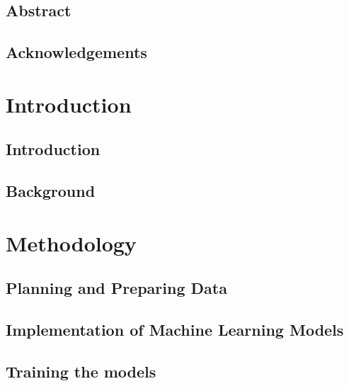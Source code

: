 \documentclass[UKenglish]{ifimaster}
\title{\problemStatement}
\subtitle{
}
\author{Joakim Ihle Frogner}
\begin{document}
\duoforside[dept={Department of Informatics},
program={Programming and Networks},
long]

\frontmatter{}
\chapter*{Abstract}


\chapter*{Acknowledgements}


\tableofcontents{} 
\listoffigures{}
\listoftables{}

\mainmatter{}
\part{Introduction}

\chapter{Introduction}
\label{chapter:introduction}


\chapter{Background}
\label{chapter:background}


\part{Methodology}
\chapter{Planning and Preparing Data}
\label{chapter:planning}


\chapter{Implementation of Machine Learning Models}
\label{chapter:models}


\chapter{Training the models}
\label{chapter:training}

\end{document}
